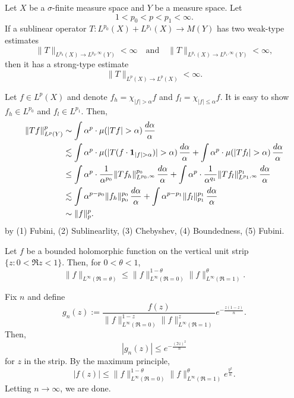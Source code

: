 \documentclass{../../large}
\begin{document}
\begin{prb}
Let $X$ be a $\sigma$-finite measure space and $Y$ be a measure space.
Let
\[1<p_0<p<p_1<\infty.\]
If a sublinear operator $T\colon L^{p_0}(X)+L^{p_1}(X)\to M(Y)$ has two weak-type estimates
\[\|T\|_{L^{p_0}(X)\to L^{p_0,\infty}(Y)}<\infty\quad\text{and}\quad\|T\|_{L^{p_1}(X)\to L^{p_1,\infty}(Y)}<\infty,\]
then it has a strong-type estimate
\[\|T\|_{L^p(X)\to L^p(X)}<\infty.\]
\end{prb}
\begin{pf}
Let $f\in L^p(X)$ and denote $f_h=\chi_{|f|>\alpha}f$ and $f_l=\chi_{|f|\le\alpha}f$.
It is easy to show $f_h\in L^{p_0}$ and $f_l\in L^{p_1}$.
Then,
\begin{align*} %
\|Tf\|_{L^p(Y)}^p&\sim\int\alpha^p\cdot\mu(|Tf|>\alpha)\,\frac{d\alpha}\alpha\\
&\lesssim\int\alpha^p\cdot\mu(|T(f\cdot\1_{|f|>\alpha})|>\alpha)\,\frac{d\alpha}\alpha+\int\alpha^p\cdot\mu(|Tf_l|>\alpha)\,\frac{d\alpha}\alpha\\
&\le\int\alpha^p\cdot\frac1{\alpha^{p_0}}\|Tf_h\|_{L^{p_0,\infty}}^{p_0}\,\frac{d\alpha}\alpha+\int\alpha^p\cdot\frac1{\alpha^{q_1}}\|Tf_l\|_{L^{p_1,\infty}}^{p_1}\,\frac{d\alpha}\alpha\\
&\lesssim\int\alpha^{p-p_0}\|f_h\|_{p_0}^{p_0}\,\frac{d\alpha}\alpha+\int\alpha^{p-p_1}\|f_l\|_{p_1}^{p_1}\,\frac{d\alpha}\alpha\\
&\sim\|f\|_p^p.
\end{align*}
by (1) Fubini, (2) Sublinearlity, (3) Chebyshev, (4) Boundedness, (5) Fubini.
\end{pf}

\begin{prb}
Let $f$ be a bounded holomorphic function on the vertical unit strip $\{z:0<\Re z<1\}$.
Then, for $0<\theta<1$,
\[\|f\|_{L^\infty(\Re=\theta)}\le\|f\|_{L^\infty(\Re=0)}^{1-\theta}\|f\|_{L^\infty(\Re=1)}^\theta.\]
\end{prb}
\begin{pf}
Fix $n$ and define
\[g_n(z):=\frac{f(z)}{\|f\|_{L^\infty(\Re=0)}^{1-z}\|f\|_{L^\infty(\Re=1)}^z}e^{-\frac{z(1-z)}n}.\]
Then,
\[|g_n(z)|\le e^{-\frac{(\Im z)^2}n}\]
for $z$ in the strip.
By the maximum principle,
\[|f(z)|\le\|f\|_{L^\infty(\Re=0)}^{1-\theta}\|f\|_{L^\infty(\Re=1)}^\theta e^{\frac{y^2}n}.\]
Letting $n\to\infty$, we are done.
\end{pf}
\end{document}
